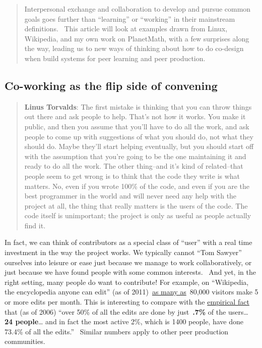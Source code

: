 
\begin{quote}
 Interpersonal exchange and
collaboration to develop and pursue common goals goes further than
``learning'' or ``working'' in their mainstream definitions. ~This
article will look at examples drawn from Linux, Wikipedia, and my own
work on PlanetMath, with a few surprises along the way, leading us to
new ways of thinking about how to do co-design when build systems for
peer learning and peer production.
\end{quote}

\subsection{Co-working as the flip side of convening}

\begin{quote}
\textbf{Linus Torvalds}: The first mistake is thinking that you can
throw things out there and ask people to help. That's not how it works.
You make it public, and then you assume that you'll have to do all the
work, and ask people to come up with suggestions of what you should do,
not what they should do. Maybe they'll start helping eventually, but you
should start off with the assumption that you're going to be the one
maintaining it and ready to do all the work. The other thing--and it's
kind of related--that people seem to get wrong is to think that the code
they write is what matters. No, even if you wrote 100\% of the code, and
even if you are the best programmer in the world and will never need any
help with the project at all, the thing that really matters is the users
of the code. The code itself is unimportant; the project is only as
useful as people actually find it.
\end{quote}

In fact, we can think of contributors as a special class of ``user''
with a real time investment in the way the project works. We typically
cannot ``Tom Sawyer'' ourselves into leisure or ease just because we
manage to work collaboratively, or just because we have found people
with some common interests.~ And yet, in the right setting, many people
do want to contribute! For example, on ``Wikipedia, the encyclopedia
anyone can edit'' (as of
2011)~\href{http://\%20http://www.readwriteweb.com/archives/wikipedias_goal_1_billion_monthly_visitors_by_2015.php}{as
many as}~80,000 visitors make 5 or more edits per month. This is interesting to compare with the
\href{http://www.aaronsw.com/weblog/whowriteswikipedia}{empirical fact}
that (as of 2006) ``over 50\% of all the edits are done by just~\textbf{.7\%} of
the users\ldots{} \textbf{24 people}\ldots{} and in fact the most active 2\%,
which is 1400 people, have done 73.4\% of all the edits.''~ Similar
numbers apply to other peer production communities.

